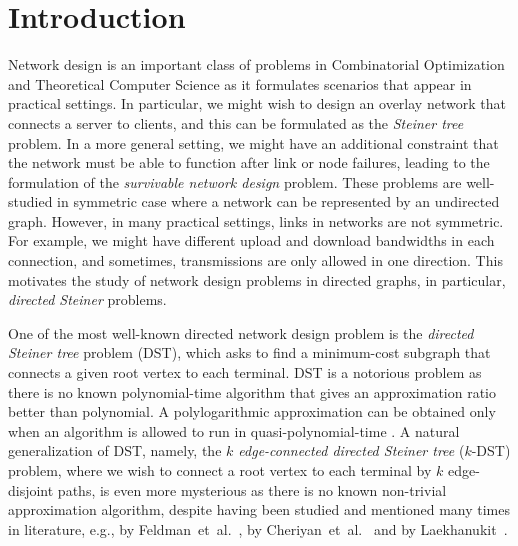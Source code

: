 \documentclass[11pt]{article}
\theoremstyle{definition}
\theoremstyle{remark}
\begin{document}
\section{Introduction}
\label{sec:intro}

Network design is an important class of problems in Combinatorial
Optimization and Theoretical Computer Science as 
it formulates scenarios that appear in practical settings. 
In particular, we might wish to design an overlay network that
connects a server to clients, and this can be formulated as 
the {\em Steiner tree} problem.
In a more general setting, we might have an additional constraint
that the network must be able to function after 
link or node failures, leading to 
the formulation of the {\em survivable network design} problem. 
These problems are well-studied in symmetric case
where a network can be represented by an undirected graph. 
However, in many practical settings,
links in networks are not symmetric.
For example, we might have different upload and download bandwidths in
each connection, and sometimes, transmissions are only allowed in one
direction.
This motivates the study of network design problems in directed
graphs, in particular, {\em directed Steiner} problems.

One of the most well-known directed network design problem 
is the {\em directed Steiner tree} problem (DST), which asks to find a
minimum-cost subgraph that connects a given root vertex to each
terminal.
DST is a notorious problem as there is no known polynomial-time
algorithm that gives an approximation ratio better than polynomial. 
A polylogarithmic approximation can be obtained only when an algorithm
is allowed to run in quasi-polynomial-time
\cite{CharikarCCDGGL99,Rothvoss11,FriggstadKKLST14}.
A natural generalization of DST, namely, 
the {\em $k$ edge-connected directed Steiner tree} ($k$-DST) problem,
where we wish to connect a root vertex to each terminal by $k$
edge-disjoint paths, is even more mysterious as there is no known
non-trivial approximation algorithm, despite having been studied and
mentioned many times in literature, e.g., 
by Feldman~et~al.~\cite{FeldmanKN12}, 
by Cheriyan~et~al.~\cite{CheriyanLNV14}
and by Laekhanukit~\cite{Laekhanukit14}. 
\end{document}
